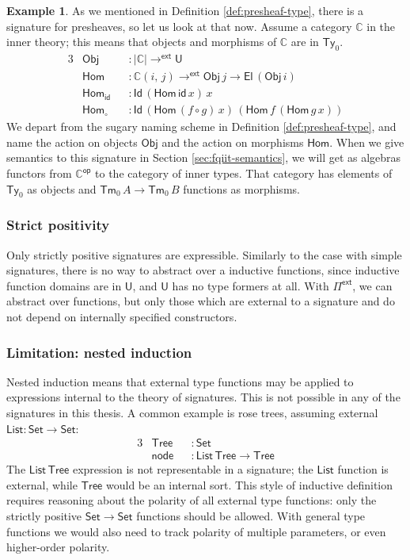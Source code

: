 \documentclass[12pt,a4paper,twoside,openany]{book}
\theoremstyle{remark}
\theoremstyle{definition}
\newtheorem{myexample}{Example}
\theoremstyle{theorem}
\newcommand{\ms}[1]{\mathsf{#1}}
\newcommand{\mbb}[1]{\mathbb{#1}}
\newcommand{\id}{\mathsf{id}}
\newcommand{\Tm}{\mathsf{Tm}}
\newcommand{\Ty}{\mathsf{Ty}}
\newcommand{\U}{\mathsf{U}}
\newcommand{\El}{\mathsf{El}}
\newcommand{\Id}{\mathsf{Id}}
\newcommand{\Set}{\mathsf{Set}}
\newcommand{\Pie}{\Pi^{\mathsf{ext}}}
\newcommand{\toe}{\to^{\ms{ext}}}
\newcommand{\mbbC}{\mbb{C}}
\begin{document}
\begin{myexample}
\label{ex:presheaf-sig}
As we mentioned in Definition \ref{def:presheaf-type}, there is a signature for
presheaves, so let us look at that now. Assume a category $\mbbC$ in the inner
theory; this means that objects and morphisms of $\mbbC$ are in $\Ty_0$.
\begin{alignat*}{3}
  & \ms{Obj}         &&: |\mbbC| \toe \U\\
  & \ms{Hom}         &&: \mbbC(i,\,j) \toe \ms{Obj}\,j \to \El\,(\ms{Obj}\,i)\\
  & \ms{Hom_{\ms{id}}} &&: \Id\,(\ms{Hom}\,\id\,x)\,x\\
  & \ms{Hom_{\circ}}  &&: \Id\,(\ms{Hom}\,(f \circ g)\,x)\,(\ms{Hom}\,f\,(\ms{Hom}\,g\,x))
\end{alignat*}
We depart from the sugary naming scheme in Definition \ref{def:presheaf-type},
and name the action on objects $\ms{Obj}$ and the action on morphisms
$\ms{Hom}$. When we give semantics to this signature in Section \ref{sec:fqiit-semantics}, we
will get as algebras functors from $\mbbC^{\ms{op}}$ to the category of inner
types. That category has elements of $\Ty_0$ as objects and $\Tm_0\,A \to
\Tm_0\,B$ functions as morphisms.
\end{myexample}

\subsubsection{Strict positivity}

Only strictly positive signatures are expressible. Similarly to the case with
simple signatures, there is no way to abstract over a inductive functions, since
inductive function domains are in $\U$, and $\U$ has no type formers at
all. With $\Pie$, we can abstract over functions, but only those which are
external to a signature and do not depend on internally specified constructors.

\subsubsection{Limitation: nested induction}

Nested induction means that external type functions may be applied to
expressions internal to the theory of signatures. This is not possible in any of
the signatures in this thesis. A common example is rose trees, assuming
external $\ms{List} : \Set \to \Set$:
\begin{alignat*}{3}
  &\ms{Tree} &&: \Set\\
  &\ms{node} &&: \ms{List}\,\ms{Tree} \to \ms{Tree}
\end{alignat*}
The $\ms{List}\,\ms{Tree}$ expression is not representable in a signature; the
$\ms{List}$ function is external, while $\ms{Tree}$ would be an internal sort.
This style of inductive definition requires reasoning about the polarity of all
external type functions: only the strictly positive $\Set \to \Set$ functions
should be allowed. With general type functions we would also need to track
polarity of multiple parameters, or even higher-order polarity.
\end{document}
